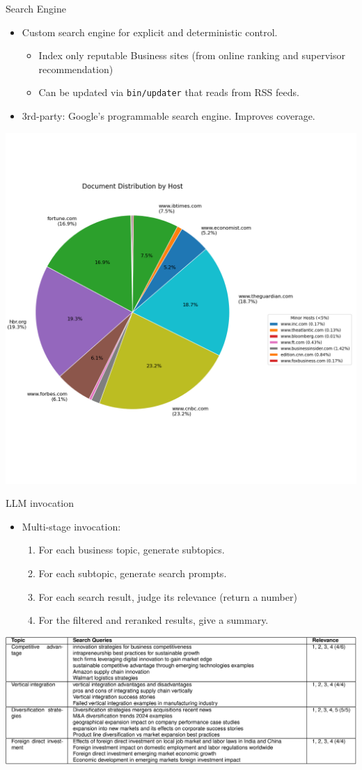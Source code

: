 \documentclass{beamer}
\begin{document}
\begin{frame}{Search Engine}
\begin{itemize}
	\item Custom search engine for explicit and deterministic control.
	\begin{itemize}
	\item Index only reputable Business sites (from online ranking and
		supervisor recommendation)
	\item Can be updated via \texttt{bin/updater} that reads from RSS feeds.
	\end{itemize}
	\item 3rd-party: Google's programmable search engine. Improves coverage.
\end{itemize}
	\vspace{-.6cm}
	\begin{center}
	\includegraphics[width=.5\textwidth]{../../deliverables/thesis/res/doc_host_dist.png}
	\end{center}
\end{frame}

\begin{frame}{LLM invocation}
	\begin{itemize}
	\item Multi-stage invocation: 
		\begin{enumerate}
		\item For each business topic, generate subtopics.
		\item For each subtopic, generate search prompts.
		\item For each search result, judge its relevance (return a number)
		\item For the filtered and reranked results, give a summary.
		\end{enumerate}
	\end{itemize}
	\begin{center}
	\includegraphics[height=.4\textheight]{../../deliverables/thesis/res/table_search_queries.png}
	\end{center}
\end{frame}
\end{document}
